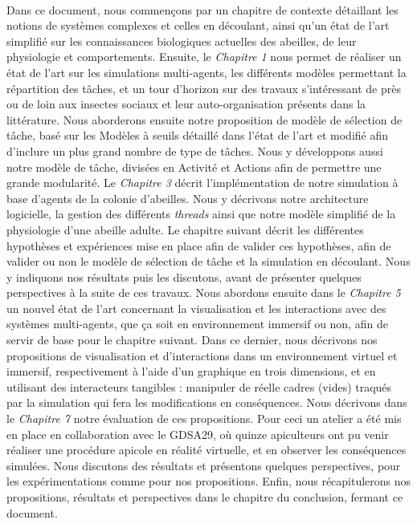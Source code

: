 	\paragraph{}
	Dans ce document, nous commençons par un chapitre de contexte détaillant les notions de systèmes complexes et celles en découlant, ainsi qu'un état de l'art simplifié sur les connaissances biologiques actuelles des abeilles, de leur physiologie et comportements.
	 Ensuite, le \textit{Chapitre 1} nous permet de réaliser un état de l'art sur les simulations multi-agents, les différents modèles permettant la répartition des tâches, et un tour d'horizon sur des travaux s'intéressant de près ou de loin aux insectes sociaux et leur auto-organisation présents dans la littérature. 
	 Nous aborderons ensuite notre proposition de modèle de sélection de tâche, basé sur les Modèles à seuils détaillé dans l'état de l'art et modifié afin d'inclure un plus grand nombre de type de tâches. Nous y développons aussi notre modèle de tâche, divisées en Activité et Actions afin de permettre une grande modularité. 
	 Le \textit{Chapitre 3} décrit l'implémentation de notre simulation à base d'agents de la colonie d'abeilles. Nous y décrivons notre architecture logicielle, la gestion des différents \textit{threads} ainsi que notre modèle simplifié de la physiologie d'une abeille adulte. 
	 Le chapitre suivant décrit les différentes hypothèses et expériences mise en place afin de valider ces hypothèses, afin de valider ou non le modèle de sélection de tâche et la simulation en découlant. Nous y indiquons nos résultats puis les discutons, avant de présenter quelques perspectives à la suite de ces travaux. 
	 Nous abordons ensuite dans le \textit{Chapitre 5} un nouvel état de l'art concernant la visualisation et les interactions avec des systèmes multi-agents, que ça soit en environnement immersif ou non, afin de servir de base pour le chapitre suivant. 
	 Dans ce dernier, nous décrivons nos propositions de visualisation et d'interactions dans un environnement virtuel et immersif, respectivement à l'aide d'un graphique en trois dimensions, et en utilisant des interacteurs tangibles : manipuler de réelle cadres (vides) traqués par la simulation qui fera les modifications en conséquences. 
	 Nous décrivons dans le \textit{Chapitre 7} notre évaluation de ces propositions. Pour ceci un atelier a été mis en place en collaboration avec le GDSA29, où quinze apiculteurs ont pu venir réaliser une procédure apicole en réalité virtuelle, et en observer les conséquences simulées. Nous discutons des résultats et présentons quelques perspectives, pour les expérimentations comme pour nos propositions. 
	 Enfin, nous récapitulerons nos propositions, résultats et perspectives dans le chapitre du conclusion, fermant ce document.